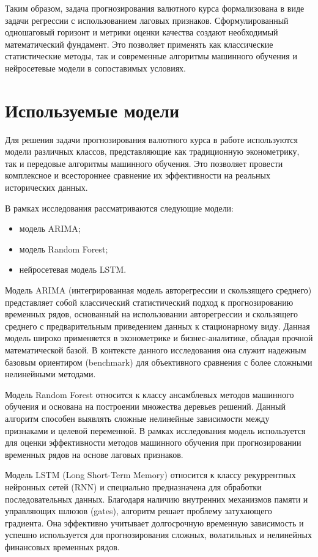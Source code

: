 Таким образом, задача прогнозирования валютного курса формализована в виде задачи регрессии с использованием лаговых признаков. Сформулированный одношаговый горизонт и метрики оценки качества создают необходимый математический фундамент. Это позволяет применять как классические статистические методы, так и современные алгоритмы машинного обучения и нейросетевые модели в сопоставимых условиях.

\section{Используемые модели}
Для решения задачи прогнозирования валютного курса в работе используются модели различных классов, представляющие как традиционную эконометрику, так и передовые алгоритмы машинного обучения. Это позволяет провести комплексное и всестороннее сравнение их эффективности на реальных исторических данных.

В рамках исследования рассматриваются следующие модели:
\begin{itemize}
    \item модель ARIMA;
    \item модель Random Forest;
    \item нейросетевая модель LSTM.
\end{itemize}

Модель ARIMA (интегрированная модель авторегрессии и скользящего среднего) представляет собой классический статистический подход к прогнозированию временных рядов, основанный на использовании авторегрессии и скользящего среднего с предварительным приведением данных к стационарному виду. Данная модель широко применяется в эконометрике и бизнес-аналитике, обладая прочной математической базой. В контексте данного исследования она служит надежным базовым ориентиром (benchmark) для объективного сравнения с более сложными нелинейными методами.

Модель Random Forest относится к классу ансамблевых методов машинного обучения и основана на построении множества деревьев решений. Данный алгоритм способен выявлять сложные нелинейные зависимости между признаками и целевой переменной. В рамках исследования модель используется для оценки эффективности методов машинного обучения при прогнозировании временных рядов на основе лаговых признаков.

Модель LSTM (Long Short-Term Memory) относится к классу рекуррентных нейронных сетей (RNN) и специально предназначена для обработки последовательных данных. Благодаря наличию внутренних механизмов памяти и управляющих шлюзов (gates), алгоритм решает проблему затухающего градиента. Она эффективно учитывает долгосрочную временную зависимость и успешно используется для прогнозирования сложных, волатильных и нелинейных финансовых временных рядов.

